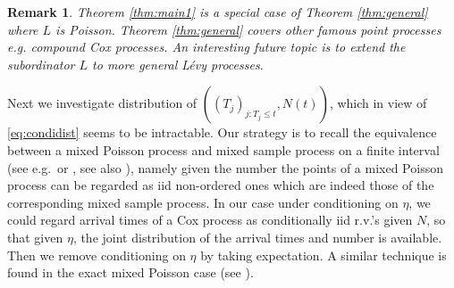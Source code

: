 \documentclass[11pt,leqno%
]{amsart}
\newtheorem{remark}[lemma]{Remark}
\newcommand{\1}{{\mathbf 1}}
\begin{document}
\begin{remark}
 Theorem \ref{thm:main1} is a special case of Theorem
 \ref{thm:general} where $L$ is
 Poisson. Theorem \ref{thm:general} covers other famous point processes e.g. compound Cox
 processes. An interesting future topic is to extend the subordinator
 $L$ to more general L\'evy
 processes. 
\end{remark}

Next we investigate distribution of $((T_j)_{j:T_j\le t},N(t))$, which 
in view of \eqref{eq:condidist} seems to be intractable. 
Our strategy is to 
recall
the equivalence between a mixed Poisson process and mixed sample process
on a finite interval 
(see
e.g.\,\cite[Theorem 6.6]{grandell:1997} or \cite[Corollary 
9.2]{kallenberg:1983}, see also \cite{matthes:kerstan:mecke:1978}), 
namely given the number the points of a mixed Poisson process can be
regarded as iid non-ordered ones which are indeed those of the
corresponding mixed sample process. 
In our case under conditioning on $\eta$, we could regard arrival times of a
Cox process as conditionally iid r.v.'s given $N$, so that given $\eta$, the joint
distribution of the arrival times and number is available. Then we 
remove conditioning on $\eta$ by taking expectation. A similar technique is found in
the exact mixed Poisson case (see \cite[Lemma 1.2.1.1]{matsui:rolski:2016}). 
\end{document}
